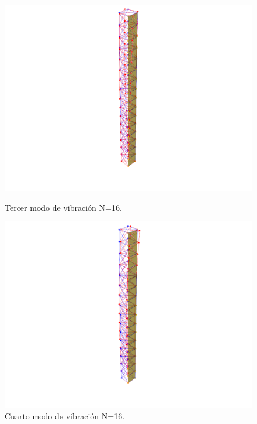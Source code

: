 \begin{figure}[H]
    \begin{minipage}[b]{0.5\textwidth}
        \centering
        \includegraphics[width=\textwidth]{FOTOS/mod3_16.png}
        \caption{Tercer modo de vibración N=16.}
    \end{minipage}
    \hfill
    \begin{minipage}[b]{0.5\textwidth}
        \centering
        \includegraphics[width=\textwidth]{FOTOS/mod4_16.png}
        \caption{Cuarto modo de vibración N=16.}
    \end{minipage}
\end{figure}

